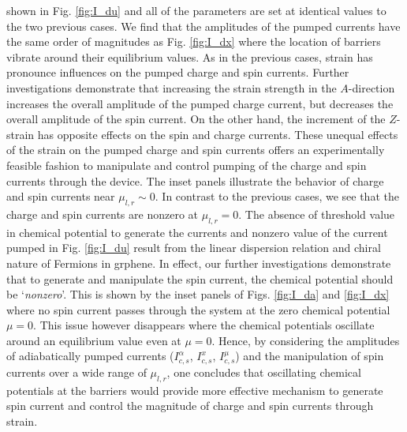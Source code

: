 \documentclass[doublecol]{epl2}
\begin{document}
shown in Fig. \ref{fig:I_du} and all of the parameters are set at identical values to the two previous cases.
We find that the amplitudes of the pumped currents have the same order of magnitudes as Fig. \ref{fig:I_dx}
where the location of barriers vibrate around their equilibrium values. As in the previous cases, strain has
pronounce influences on the pumped charge and spin currents. Further investigations demonstrate that
increasing the strain strength in the $A$-direction increases the overall amplitude of the pumped charge
current, but decreases the overall amplitude of the spin current. On the other hand, the increment of the
$Z$-strain has opposite effects on the spin and charge currents. These unequal effects of the strain on the
pumped charge and spin currents offers an experimentally feasible fashion to manipulate and control pumping of
the charge and spin currents through the device. The inset panels illustrate the behavior of charge and spin
currents near $\mu_{l,r}\sim 0$. In contrast to the previous cases, we see that the charge and spin currents
are nonzero at $\mu_{l,r}=0$. The absence of threshold value in chemical potential to generate the currents
and nonzero value of the current pumped in Fig. \ref{fig:I_du} result from the linear dispersion relation and
chiral nature of Fermions in grphene\cite{cite:Pradaprb09,cite:abdollahipour14}. In effect, our further
investigations demonstrate that to generate and manipulate the spin current, the chemical potential should be
`{\it nonzero}'. This is shown by the inset panels of Figs. \ref{fig:I_da} and \ref{fig:I_dx} where no spin
current passes through the system at the zero chemical potential $\mu=0$. This issue however disappears where
the chemical potentials oscillate around an equilibrium value even at $\mu=0$. Hence, by considering the
amplitudes of adiabatically pumped currents ($I_{c,s}^{\alpha}$, $I_{c,s}^{x}$, $I_{c,s}^{\mu}$) and the
manipulation of spin currents over a wide range of $\mu_{l,r}$, one concludes that oscillating chemical
potentials at the barriers would provide more effective mechanism to generate spin current and control the
magnitude of charge and spin currents through strain.
\end{document}
